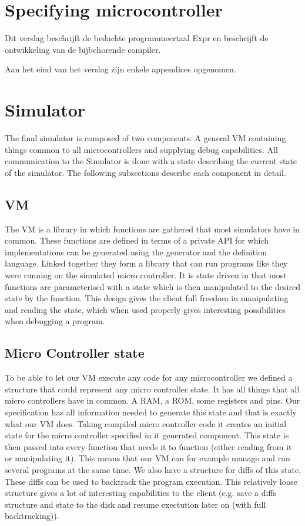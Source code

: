 \documentclass[a4paper]{report}
\begin{document}
\chapter{Specifying microcontroller}
Dit verslag beschrijft de bedachte programmeertaal Expr en beschrijft de
ontwikkeling van de bijbehorende compiler.

Aan het eind van het verslag zijn enkele appendices opgenomen. 

\chapter{Simulator}
The final simulator is composed of two components: A general VM
containing things common to all microcontrollers and supplying debug
capabilities. All communication to the Simulator is done with a state
describing the current state of the simulator. The following
subsections describe each component in detail.

\section{VM}

The VM is a library in which functions are gathered that most simulators
have in common. These functions are defined in terms of a private API
for which implementations can be generated using the generator and the
definition language. Linked together they form a library that can run
programs like they were running on the simulated micro controller. It
is state driven in that most functions are parameterised with a state
which is then manipulated to the desired state by the function. This
design gives the client full freedom in manipulating and reading the
state, which when used properly gives interesting possibilities when
debugging a program.

\section{Micro Controller state}
To be able to let our VM execute any code for any microcontroller we
defined a structure that could represent any micro controller state. It
has all things that all micro controllers have in common. A RAM, a ROM,
some registers and pins. Our specification has all information needed
to generate this state and that is exactly what our VM does. Taking
compiled micro controller code it creates an initial state for the
micro controller specified in it generated component. This state is
then passed into every function that needs it to function (either
reading from it or manipulating it). This means that our VM can for
example manage and run several programs at the same time. We also have
a structure for diffs of this state. These diffs can be used to
backtrack the program execution. This relatively loose structure gives
a lot of interesting capabilities to the client (e.g. save a diffs
structure and state to the disk and resume exectution later on (with
full backtracking)).
\end{document}
